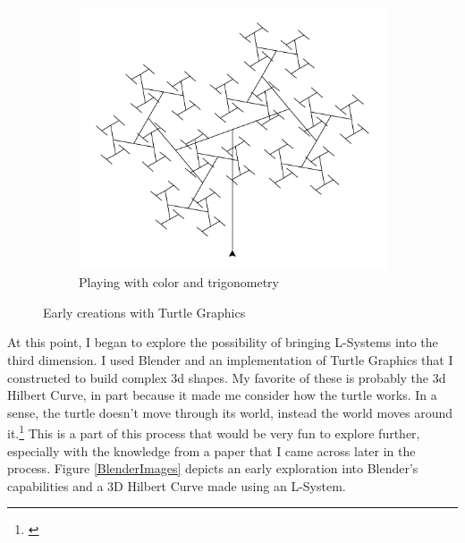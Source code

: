 \documentclass[12pt,twoside]{reedthesis}
\begin{document}
\begin{figure}[h]
\begin{subfigure}{0.5\linewidth}
		\includegraphics[width=\linewidth]{Images/OldTurtle2}
		\caption{Playing with color and trigonometry}
		\label{3dSine}
	\end{subfigure}
	\caption{Early creations with Turtle Graphics}
	\label{oldTurtle}
	\end{figure}
	
	At this point, I began to explore the possibility of bringing L-Systems into the third dimension. I used Blender and an implementation of Turtle Graphics that I constructed to build complex 3d shapes. My favorite of these is probably the 3d Hilbert Curve, in part because it made me consider how the turtle works. In a sense, the turtle doesn't move through its world, instead the world moves around it.\footnote{\cite{derose1989}} This is a part of this process that would be very fun to explore further, especially with the knowledge from a paper that I came across later in the process. Figure \ref{BlenderImages} depicts an early exploration into Blender's capabilities and a 3D Hilbert Curve made using an L-System.\\
	
	
\end{document}
